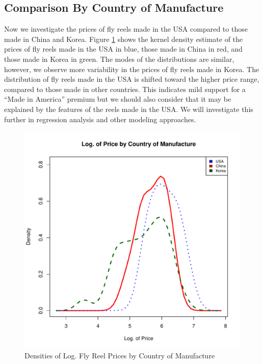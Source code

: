 \documentclass[11pt]{book}
\begin{document}
\clearpage
\pagebreak
\subsection{Comparison By Country of Manufacture}

Now we investigate the prices of fly reels made in the USA
compared to those made in China and Korea.
Figure \ref{fig:dens_by_country} shows the 
kernel density estimate of the prices of 
fly reels made in the USA in blue,
those made in China in red, 
and those made in Korea in green.
% 
The modes of the distributions are similar, 
however, we observe more variability in the prices of fly reels
made in Korea. 
The distribution of fly reels made in the USA is shifted 
toward the higher price range, compared to those made in other countries.
This indicates mild support for a ``Made in America'' premium
but we should also consider that it may be explained by 
the features of the reels made in the USA. 
We will investigate this further in regression analysis 
and other modeling approaches. 



\begin{figure}[h!]
  \centering
  \includegraphics[scale = 0.5, keepaspectratio=true]{../Figures/dens_by_country}
  \caption{Densities of Log. Fly Reel Prices by Country of Manufacture} \label{fig:dens_by_country}
\end{figure}
\end{document}
